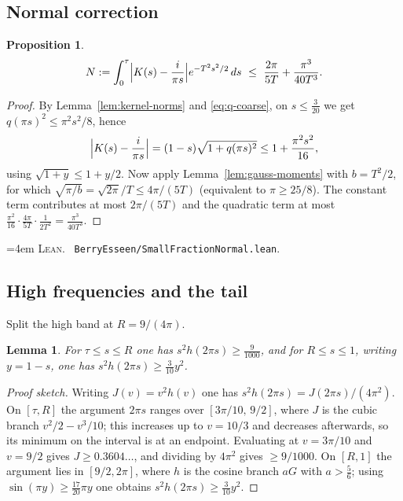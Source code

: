 \documentclass[10pt,a4paper]{article}
\theoremstyle{plain}
\newtheorem{proposition}[theorem]{Proposition}
\newtheorem{lemma}[theorem]{Lemma}
\theoremstyle{definition}
\newcommand{\file}[1]{\texttt{#1}}
\newenvironment{leanref}%
  {\par\addvspace{3pt}\begingroup\sloppy\emergencystretch=4em
   \noindent\footnotesize\textsc{Lean.}\ \ignorespaces}%
  {\par\endgroup\addvspace{3pt}}
\begin{document}
\subsection{Normal correction}

\begin{proposition}\label{prop:small-normal}
\[
  N := \int_0^\tau\Bigl|K(s)-\frac{i}{\pi s}\Bigr|e^{-T^2s^2/2}\,ds
  \ \le\ \frac{2\pi}{5T}+\frac{\pi^3}{40T^3}.
\]
\end{proposition}

\begin{proof}
By Lemma~\ref{lem:kernel-norms} and \eqref{eq:q-coarse}, on $s\le\tfrac3{20}$
we get $q(\pi s)^2\le\pi^2s^2/8$, hence
\[
  \Bigl|K(s)-\frac{i}{\pi s}\Bigr| = (1-s)\sqrt{1+q(\pi s)^2}
  \le 1+\frac{\pi^2s^2}{16},
\]
using $\sqrt{1+y}\le1+y/2$. Now apply Lemma~\ref{lem:gauss-moments} with
$b=T^2/2$, for which $\sqrt{\pi/b}=\sqrt{2\pi}/T\le4\pi/(5T)$ (equivalent to
$\pi\ge25/8$). The constant term contributes at most $2\pi/(5T)$ and the
quadratic term at most
$\tfrac{\pi^2}{16}\cdot\tfrac{4\pi}{5T}\cdot\tfrac1{2T^2}=\tfrac{\pi^3}{40T^3}$.
\end{proof}

\begin{leanref}
\file{BerryEsseen/SmallFractionNormal.lean}.
\end{leanref}

\subsection{High frequencies and the tail}

Split the high band at $R=9/(4\pi)$.

\begin{lemma}\label{lem:small-decay}
For $\tau\le s\le R$ one has $s^2h(2\pi s)\ge\tfrac9{1000}$, and for
$R\le s\le1$, writing $y=1-s$, one has $s^2h(2\pi s)\ge\tfrac3{10}y^2$.
\end{lemma}

\begin{proof}[Proof sketch]
Writing $J(v)=v^2h(v)$ one has $s^2h(2\pi s)=J(2\pi s)/(4\pi^2)$. On
$[\tau,R]$ the argument $2\pi s$ ranges over $[3\pi/10,\,9/2]$, where $J$ is the
cubic branch $v^2/2-v^3/10$; this increases up to $v=10/3$ and decreases
afterwards, so its minimum on the interval is at an endpoint. Evaluating at
$v=3\pi/10$ and $v=9/2$ gives $J\ge0.3604\ldots$, and dividing by $4\pi^2$
gives $\ge9/1000$. On $[R,1]$ the argument lies in $[9/2,2\pi]$, where $h$ is
the cosine branch $aG$ with $a>\tfrac56$; using $\sin(\pi y)\ge\tfrac{17}{20}\pi y$
one obtains $s^2h(2\pi s)\ge\tfrac3{10}y^2$.
\end{proof}
\end{document}
